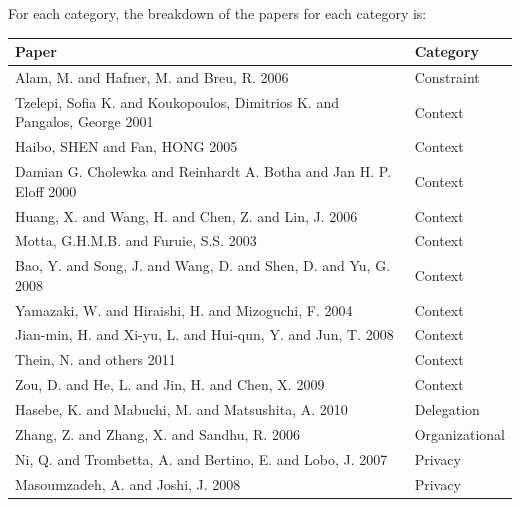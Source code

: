 \documentclass[letterpaper,10pt,english]{sphinxmanual}
\begin{document}
For each category, the breakdown of the papers for each category is:

\begin{tabulary}{\linewidth}{|L|L|}
\hline
\textbf{
Paper
} & \textbf{
Category
}\\\hline

Alam, M. and Hafner, M. and Breu, R. 2006
 & 
Constraint
\\\hline

Tzelepi, Sofia K. and Koukopoulos, Dimitrios K. and Pangalos, George 2001
 & 
Context
\\\hline

Haibo, SHEN and Fan, HONG 2005
 & 
Context
\\\hline

Damian G. Cholewka and Reinhardt A. Botha and Jan H. P. Eloff 2000
 & 
Context
\\\hline

Huang, X. and Wang, H. and Chen, Z. and Lin, J. 2006
 & 
Context
\\\hline

Motta, G.H.M.B. and Furuie, S.S. 2003
 & 
Context
\\\hline

Bao, Y. and Song, J. and Wang, D. and Shen, D. and Yu, G. 2008
 & 
Context
\\\hline

Yamazaki, W. and Hiraishi, H. and Mizoguchi, F. 2004
 & 
Context
\\\hline

Jian-min, H. and Xi-yu, L. and Hui-qun, Y. and Jun, T. 2008
 & 
Context
\\\hline

Thein, N. and others 2011
 & 
Context
\\\hline

Zou, D. and He, L. and Jin, H. and Chen, X. 2009
 & 
Context
\\\hline

Hasebe, K. and Mabuchi, M. and Matsushita, A. 2010
 & 
Delegation
\\\hline

Zhang, Z. and Zhang, X. and Sandhu, R. 2006
 & 
Organizational
\\\hline

Ni, Q. and Trombetta, A. and Bertino, E. and Lobo, J. 2007
 & 
Privacy
\\\hline

Masoumzadeh, A. and Joshi, J. 2008
 & 
Privacy
\\\hline


\end{tabulary}
\end{document}
